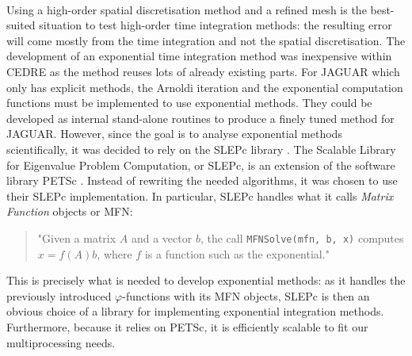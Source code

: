       \paragraph{}
      Using a high-order spatial discretisation method and a refined mesh is the best-suited situation to test high-order time integration methods: the resulting error will come mostly from the time integration and not the spatial discretisation.
      The development of an exponential time integration method was inexpensive within CEDRE as the method reuses lots of already existing parts.
      For JAGUAR which only has explicit methods, the Arnoldi iteration and the exponential computation functions must be implemented to use exponential methods.
      They could be developed as internal stand-alone routines to produce a finely tuned method for JAGUAR.
      However, since the goal is to analyse exponential methods scientifically, it was decided to rely on the SLEPc library \cite{HernandezRomanVidal2005}.
      The Scalable Library for Eigenvalue Problem Computation, or SLEPc, is an extension of the software library PETSc \cite{petsc-web-page, petsc-user-ref, petsc-efficient}.
      Instead of rewriting the needed algorithms, it was chosen to use their SLEPc implementation.
      In particular, SLEPc handles what it calls \emph{Matrix Function} objects or MFN:
      \begin{quote}
        "Given a matrix $A$ and a vector $b$, the call \texttt{MFNSolve(mfn, b, x)} computes \\
        $x=f\left(A\right) b$, where $f$ is a function such as the exponential."
      \end{quote}
      This is precisely what is needed to develop exponential methods: as it handles the previously introduced $\varphi$-functions with its MFN objects, SLEPc is then an obvious choice of a library for implementing exponential integration methods.
      Furthermore, because it relies on PETSc, it is efficiently scalable to fit our multiprocessing needs.

